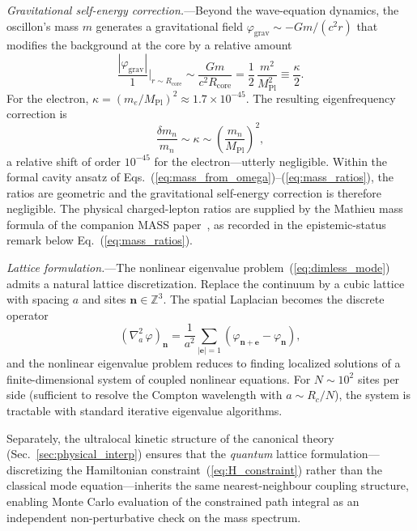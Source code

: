\documentclass[aps,prd,onecolumn,superscriptaddress,nofootinbib,showpacs,12pt,notitlepage]{revtex4-2}
\newcommand{\Mpl}{M_{\mathrm{Pl}}}
\begin{document}
\textit{Gravitational self-energy correction.}---Beyond
the wave-equation dynamics, the oscillon's mass $m$
generates a gravitational field
$\varphi_{\mathrm{grav}} \sim -Gm/(c^2 r)$ that modifies
the background at the core by a relative amount
\begin{equation}
  \frac{|\varphi_{\mathrm{grav}}|}{1}
  \bigg|_{r \sim R_{\mathrm{core}}}
  \sim \frac{Gm}{c^2 R_{\mathrm{core}}}
  = \frac{1}{2}\,\frac{m^2}{\Mpl^2}
  \equiv \frac{\kappa}{2}.
\end{equation}
For the electron,
$\kappa = (m_e/\Mpl)^2 \approx 1.7 \times 10^{-45}$.
The resulting eigenfrequency correction is
\begin{equation}\label{eq:mass_correction}
  \frac{\delta m_n}{m_n}
  \sim \kappa
  \sim \left(\frac{m_n}{\Mpl}\right)^2,
\end{equation}
a relative shift of order $10^{-45}$ for the
electron---utterly negligible.  Within the formal cavity
ansatz of Eqs.~(\ref{eq:mass_from_omega})--(\ref{eq:mass_ratios}),
the ratios are geometric and the gravitational self-energy
correction is therefore negligible.  The physical
charged-lepton ratios are supplied by the Mathieu mass formula
of the companion MASS paper~\cite{Lotishvili2026Mass}, as
recorded in the epistemic-status remark below
Eq.~(\ref{eq:mass_ratios}).

\textit{Lattice formulation.}---The nonlinear eigenvalue
problem~(\ref{eq:dimless_mode}) admits a natural lattice
discretization.  Replace the continuum by a cubic lattice
with spacing $a$ and sites
$\mathbf{n} \in \mathbb{Z}^3$.  The spatial Laplacian
becomes the discrete operator
\begin{equation}\label{eq:lattice_laplacian}
  (\nabla^2_a\,\varphi)_\mathbf{n}
  = \frac{1}{a^2}\sum_{|\mathbf{e}|=1}
    (\varphi_{\mathbf{n}+\mathbf{e}}
    - \varphi_\mathbf{n}),
\end{equation}
and the nonlinear eigenvalue problem reduces to finding
localized solutions of a finite-dimensional system of
coupled nonlinear equations.  For $N \sim 10^2$ sites
per side (sufficient to resolve the Compton wavelength
with $a \sim R_c/N$), the system is tractable with
standard iterative eigenvalue algorithms.

Separately, the ultralocal kinetic structure of the
canonical theory (Sec.~\ref{sec:physical_interp})
ensures that the \emph{quantum} lattice
formulation---discretizing the Hamiltonian
constraint~(\ref{eq:H_constraint}) rather than the
classical mode equation---inherits the same
nearest-neighbour coupling structure, enabling Monte
Carlo evaluation of the constrained path integral as
an independent non-perturbative check on the mass
spectrum.
\end{document}
